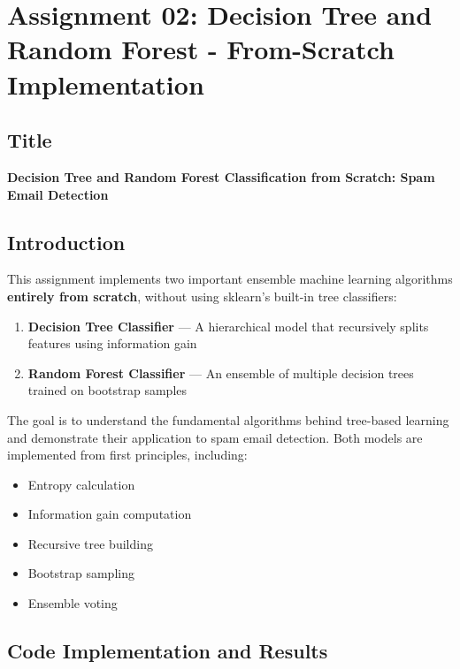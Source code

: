 \documentclass[14pt,a4paper]{report}
\begin{document}
\newpage

\chapter{Assignment 02: Decision Tree and Random Forest - From-Scratch Implementation}

\section{Title}

\textbf{\Large Decision Tree and Random Forest Classification from Scratch: Spam Email Detection}

\section{Introduction}

This assignment implements two important ensemble machine learning algorithms \textbf{entirely from scratch}, without using sklearn's built-in tree classifiers:

\begin{enumerate}
    \item \textbf{Decision Tree Classifier} --- A hierarchical model that recursively splits features using information gain
    \item \textbf{Random Forest Classifier} --- An ensemble of multiple decision trees trained on bootstrap samples
\end{enumerate}

The goal is to understand the fundamental algorithms behind tree-based learning and demonstrate their application to spam email detection. Both models are implemented from first principles, including:
\begin{itemize}
    \item Entropy calculation
    \item Information gain computation
    \item Recursive tree building
    \item Bootstrap sampling
    \item Ensemble voting
\end{itemize}

\section{Code Implementation and Results}
\end{document}
